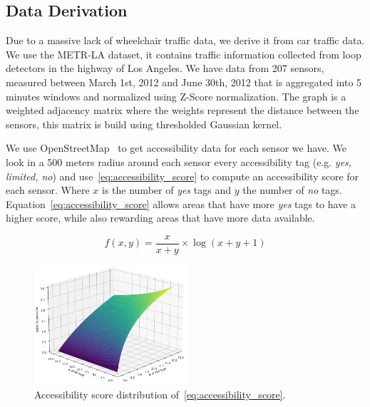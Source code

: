\subsection{Data Derivation}\label{subsec:data-derivation}
Due to a massive lack of wheelchair traffic data, we derive it from car traffic data.
We use the METR-LA dataset, it contains traffic information collected from loop detectors in the highway of Los Angeles.
We have data from 207 sensors, measured between March 1st, 2012 and June 30th, 2012 that is aggregated into 5 minutes windows and normalized using Z-Score normalization.
The graph is a weighted adjacency matrix where the weights represent the distance between the sensors, this matrix is build using thresholded Gaussian kernel\cite{Shuman_2013}.

We use OpenStreetMap~\cite{OpenStreetMap} to get accessibility data for each sensor we have.
We look in a 500 meters radius around each sensor every accessibility tag (e.g. \textit{yes, limited, no}) and use~\eqref{eq:accessibility_score} to compute an accessibility score for each sensor.
Where $x$ is the number of \textit{yes} tags and $y$ the number of \textit{no} tags.
Equation~\eqref{eq:accessibility_score} allows areas that have more \textit{yes} tags to have a higher score, while also rewarding areas that have more data available.

\begin{equation}
    f(x, y) = \frac{x}{x + y} \times \log(x + y + 1)\label{eq:accessibility_score}
\end{equation}

\begin{figure}[htbp]
    \centering
    \includegraphics[width=0.5\textwidth]{resources/accessibility_score_function}
    \caption{Accessibility score distribution of~\eqref{eq:accessibility_score}.}
    \label{fig:accessibility_score_function}
\end{figure}

